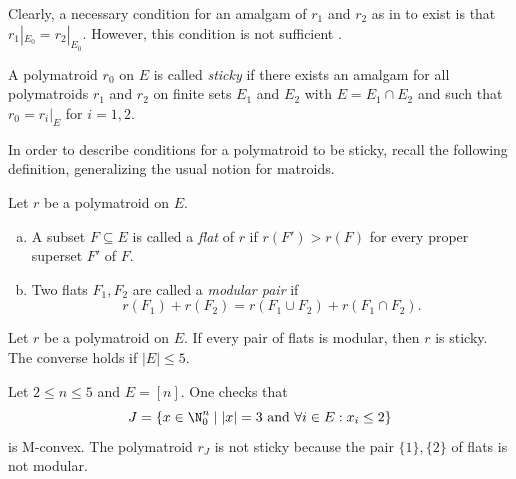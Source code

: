 Clearly, a necessary condition for an amalgam of $r_1$ and $r_2$ as in  to exist is that $r_1|_{E_0}=r_2|_{E_0}$. However, this condition is not sufficient \cite[Example~7.2.4]{oxley}.

\begin{Def}
    A polymatroid $r_0$ on $E$ is called \emph{sticky} if there exists an amalgam for all polymatroids $r_1$ and $r_2$ on finite sets $E_1$ and $E_2$ with $E=E_1\cap E_2$ and such that $r_0=r_i|_{E}$ for $i=1,2.$
\end{Def}

In order to describe conditions for a polymatroid to be sticky, recall the following definition, generalizing the usual notion for matroids.
\begin{Def}
    Let $r$ be a polymatroid on $E$.
    \begin{enumerate}[(a)]
        \item A subset $F\subseteq E$ is called a \emph{flat} of $r$ if $r(F')>r(F)$ for every proper superset $F'$ of $F$.
        \item Two flats $F_1,F_2$ are called a \emph{modular pair} if
        \begin{equation*}
            r(F_1)+r(F_2)=r(F_1\cup F_2)+r(F_1\cap F_2).
        \end{equation*}
    \end{enumerate}
\end{Def}

\begin{thm}\label{thm:stickypoly}
    Let $r$ be a polymatroid on $E$. If every pair of flats is modular, then $r$ is sticky. The converse holds if $|E|\leq5$.
\end{thm}

\begin{ex}\label{ex:uniform}
 Let $2\leq n\leq5$ and $E=[n]$. One checks that
 \begin{equation*}
     J=\{x\in\N_0^n\mid |x|=3\textrm{ and }\forall i\in E: x_i\leq 2\}
 \end{equation*}
 is M-convex. The polymatroid $r_J$ is not sticky because the pair $\{1\},\{2\}$ of flats is not modular.
\end{ex}


